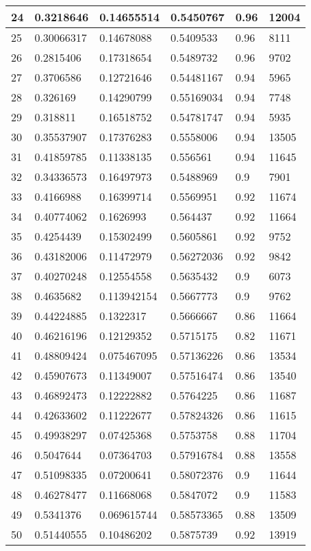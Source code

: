 \begin{longtable}{|l|l|l|l|l|l|}
24 & 0.3218646 & 0.14655514 & 0.5450767 & 0.96 & 12004 \\ \hline 
25 & 0.30066317 & 0.14678088 & 0.5409533 & 0.96 & 8111 \\ \hline 
26 & 0.2815406 & 0.17318654 & 0.5489732 & 0.96 & 9702 \\ \hline 
27 & 0.3706586 & 0.12721646 & 0.54481167 & 0.94 & 5965 \\ \hline 
28 & 0.326169 & 0.14290799 & 0.55169034 & 0.94 & 7748 \\ \hline 
29 & 0.318811 & 0.16518752 & 0.54781747 & 0.94 & 5935 \\ \hline 
30 & 0.35537907 & 0.17376283 & 0.5558006 & 0.94 & 13505 \\ \hline 
31 & 0.41859785 & 0.11338135 & 0.556561 & 0.94 & 11645 \\ \hline 
32 & 0.34336573 & 0.16497973 & 0.5488969 & 0.9 & 7901 \\ \hline 
33 & 0.4166988 & 0.16399714 & 0.5569951 & 0.92 & 11674 \\ \hline 
34 & 0.40774062 & 0.1626993 & 0.564437 & 0.92 & 11664 \\ \hline 
35 & 0.4254439 & 0.15302499 & 0.5605861 & 0.92 & 9752 \\ \hline 
36 & 0.43182006 & 0.11472979 & 0.56272036 & 0.92 & 9842 \\ \hline 
37 & 0.40270248 & 0.12554558 & 0.5635432 & 0.9 & 6073 \\ \hline 
38 & 0.4635682 & 0.113942154 & 0.5667773 & 0.9 & 9762 \\ \hline 
39 & 0.44224885 & 0.1322317 & 0.5666667 & 0.86 & 11664 \\ \hline 
40 & 0.46216196 & 0.12129352 & 0.5715175 & 0.82 & 11671 \\ \hline 
41 & 0.48809424 & 0.075467095 & 0.57136226 & 0.86 & 13534 \\ \hline 
42 & 0.45907673 & 0.11349007 & 0.57516474 & 0.86 & 13540 \\ \hline 
43 & 0.46892473 & 0.12222882 & 0.5764225 & 0.86 & 11687 \\ \hline 
44 & 0.42633602 & 0.11222677 & 0.57824326 & 0.86 & 11615 \\ \hline 
45 & 0.49938297 & 0.07425368 & 0.5753758 & 0.88 & 11704 \\ \hline 
46 & 0.5047644 & 0.07364703 & 0.57916784 & 0.88 & 13558 \\ \hline 
47 & 0.51098335 & 0.07200641 & 0.58072376 & 0.9 & 11644 \\ \hline 
48 & 0.46278477 & 0.11668068 & 0.5847072 & 0.9 & 11583 \\ \hline 
49 & 0.5341376 & 0.069615744 & 0.58573365 & 0.88 & 13509 \\ \hline 
50 & 0.51440555 & 0.10486202 & 0.5875739 & 0.92 & 13919 \\ \hline 
\end{longtable}